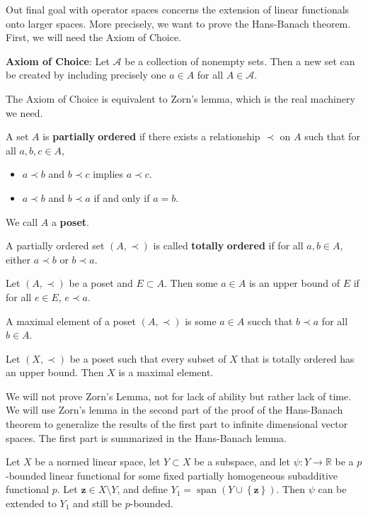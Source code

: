\documentclass[11pt, letterpaper]{report}
\begin{document}
Out final goal with operator spaces concerns the extension of linear functionals onto larger spaces. More precisely, we want to prove the Hans-Banach theorem. First, we will need the Axiom of Choice.
\begin{mdframed}[linewidth=1pt]
	\textbf{Axiom of Choice}: Let $\mathcal{A} $ be a collection of nonempty sets. Then a new set can be created by including precisely one $a\in A$ for all $A\in \mathcal{A} $.
\end{mdframed}
The Axiom of Choice is equivalent to Zorn's lemma, which is the real machinery we need.
\begin{definition}\label{dfn:2.29}
	A set $A$ is \textbf{partially} \textbf{ordered} if there exists a relationship $\prec$ on $A$ such that for all $a,b,c\in A$,
	\begin{itemize}
		\item $a\prec b$ and $b\prec c$ implies $a\prec c$.
		\item $a\prec b$ and $b\prec a$ if and only if $a=b$.
	\end{itemize}
	We call $A$ a \textbf{poset}.
\end{definition}
\begin{definition}\label{dfn:2.30}
	A partially ordered set $(A,\prec)$ is called \textbf{totally} \textbf{ordered} if for all $a,b\in A$, either $a\prec b$ or $b\prec a$.
\end{definition}
\begin{definition}\label{dfn:2.31}
	Let $(A,\prec)$ be a poset and $E\subset A$. Then some $a\in A $ is an upper bound of $E$ if for all $e\in E$, $e\prec a$.
\end{definition}
\begin{definition}\label{dfn:2.32}
	A maximal element of a poset $(A,\prec)$ is some $a\in A$ succh that $b\prec a$ for all $b\in A $.
\end{definition}
\begin{theorem}\label{thm:2.7}
	Let $(X,\prec)$ be a poset such that every subset of $X$ that is totally ordered has an upper bound. Then $X$ is a maximal element.
\end{theorem}
We will not prove Zorn's Lemma, not for lack of ability but rather lack of time. We will use Zorn's lemma in the second part of the proof of the Hans-Banach theorem to generalize the results of the first part to infinite dimensional vector spaces. The first part is summarized in the Hans-Banach lemma.
\begin{lemma}\label{lma:2.6}
	Let $X$ be a normed linear space, let $Y\subset X$ be a subspace, and let $\psi : Y \to \mathbb{R}$ be a $p$-bounded linear functional for some fixed partially homogeneous subadditive functional $p$. Let $\mathbf{z}\in X\setminus Y$, and define $Y_1 = \operatorname{span}\left( Y\cup \left\{ \mathbf{z} \right\}  \right)  $. Then $\psi $ can be extended to $Y_1$ and still be $p$-bounded.
\end{lemma}
\end{document}
